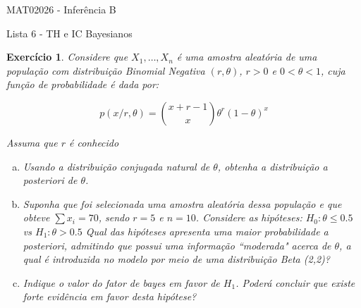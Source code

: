 \documentclass[letter,11pt]{article}
\newtheorem{exer}{Exercício}
\begin{document}
\begin{center}{ \Large MAT02026 - Inferência B }\end{center}

\begin{center}
{\large  \sc Lista 6 - TH e IC Bayesianos}
\end{center}
\vspace{5mm}

\begin{exer} \rm
Considere que $X_1, \ldots, X_n$ é uma amostra aleatória de uma população com distribuição Binomial Negativa $(r, \theta)$, $r>0$ e $0<\theta<1$, cuja função de probabilidade é dada por:

$$
p(x/ r, \theta) = {x+r-1 \choose x}\theta^r(1-\theta)^x
$$

Assuma que $r$ é conhecido

\begin{enumerate}[a)]
  \item Usando a distribuição conjugada natural de $\theta$, obtenha a distribuição a \textit{posteriori} de $\theta$.
  \item Suponha que foi selecionada uma amostra aleatória dessa população e que obteve $\sum x_i=70$, sendo $r=5$ e $n=10$. Considere as hipóteses:
$H_0: \theta \leq 0.5$ vs $H_1: \theta > 0.5$
Qual das hipóteses apresenta uma maior probabilidade a \textit{posteriori}, admitindo que possui uma informação ``moderada" acerca de $\theta$, a qual é introduzida no modelo por meio de uma distribuição Beta (2,2)?
  \item Indique o valor do fator de bayes em favor de $H_1$. Poderá concluir que existe forte evidência em favor desta hipótese?
\end{enumerate}
\end{exer}
\end{document}
